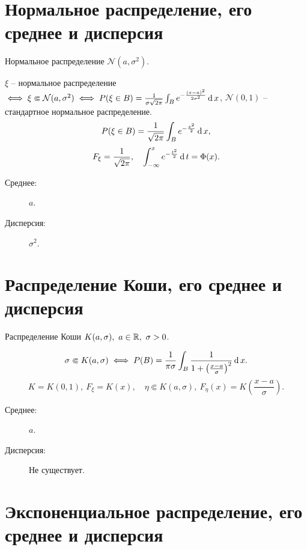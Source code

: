 \newpage

\section{Нормальное распределение, его среднее и дисперсия}

\begin{definition}
	Нормальное распределение $\mathcal{N}(a,\sigma ^2)$.

	$\xi $ -- нормальное распределение $\iff \xi \Subset \mathcal{N}(a,\sigma ^2)\iff P(\xi \in B) = \frac{1}{\sigma \sqrt{2\pi} } \int_{B} e^{-\frac{(x-a)^2}{2 \sigma ^2} } \operatorname{d} x$, $\mathcal{N}(0,1)$ -- стандартное нормальное распределение.
	\[
		P(\xi \in B) = \frac{1}{\sqrt{2 \pi} } \int_{B} e^{- \frac{x^2}{2} } \operatorname{d} x,
	\]
	\[
		F_{\xi } = \frac{1}{\sqrt{2\pi} } , \quad \int_{-\infty }^{x} e^{-\frac{t^2}{2} } \operatorname{d} t = \Phi (x).
	\]

	\begin{description}
		\item[Среднее:] $a $.
		\item[Дисперсия:] $\sigma ^2 $.
	\end{description}
\end{definition}

\section{Распределение Коши, его среднее и дисперсия}

\begin{definition}
	Распределение Коши $K(a,\sigma ), \ a \in \mathbb{R}, \ \sigma > 0$.

	\[
		\sigma \Subset K(a,\sigma ) \iff P(B) = \frac{1}{\pi \sigma } \int_{B} \frac{1}{1 + \left(\frac{x-a}{\sigma } \right)^2} \operatorname{d} x.
	\]
	\[
		K = K(0,1), \ F_{\xi } = K(x), \quad \eta \Subset K(a,\sigma ), \ F_{\eta} (x) = K \left(\frac{x-a}{\sigma } \right).
	\]

	\begin{description}
		\item[Среднее:] $a $.
		\item[Дисперсия:] Не существует.
	\end{description}
\end{definition}

\newpage

\section{Экспоненциальное распределение, его среднее и дисперсия}

